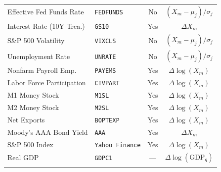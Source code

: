 \begin{longtable}{llcc}
Effective Fed Funds Rate & \texttt{FEDFUNDS} & No & $(X_m - \mu_j)/\sigma_j$ \\
Interest Rate (10Y Trea.) & \texttt{GS10} & Yes & $\Delta X_m$ \\
S\&P 500 Volatility & \texttt{VIXCLS} & No & $(X_m - \mu_j)/\sigma_j$ \\
Unemployment Rate & \texttt{UNRATE} & No & $(X_m - \mu_j)/\sigma_j$ \\
Nonfarm Payroll Emp. & \texttt{PAYEMS} & Yes & $\Delta\log(X_m)$ \\
Labor Force Participation & \texttt{CIVPART} & Yes & $\Delta\log(X_m)$ \\
M1 Money Stock & \texttt{M1SL} & Yes & $\Delta\log(X_m)$ \\
M2 Money Stock & \texttt{M2SL} & Yes & $\Delta\log(X_m)$ \\
Net Exports & \texttt{BOPTEXP} & Yes & $\Delta\log(X_m)$ \\
Moody's AAA Bond Yield & \texttt{AAA} & Yes & $\Delta X_m$ \\
S\&P 500 Index & \texttt{Yahoo Finance} & Yes & $\Delta\log(X_m)$ \\
Real GDP & \texttt{GDPC1} & --- & $\Delta\log(\text{GDP}_q)$ \\
\addlinespace
\end{longtable}
\vspace{0.5em}
